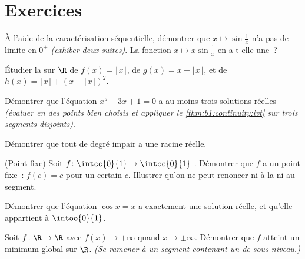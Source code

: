 \section{Exercices}

\begin{exercise}[$\star$]\label{exo:b1:continuity:1}
À l'aide de la caractérisation séquentielle, démontrer que $x \mapsto
\sin\frac 1x$ n'a pas de limite en $0^+$ \emph{(exhiber deux
suites)}. La fonction $x \mapsto x \sin\frac 1x$ en a-t-elle une~?
\end{exercise}

\begin{exercise}[$\star$]\label{exo:b1:continuity:2}
Étudier la  sur $\R$ de $f(x) = \lfloor x \rfloor$, de
$g(x) = x - \lfloor x \rfloor$, et de $h(x) = \lfloor x \rfloor +
(x - \lfloor x\rfloor)^2$.
\end{exercise}

\begin{exercise}[$\star$]\label{exo:b1:continuity:3}
Démontrer que l'équation $x^5 - 3x + 1 = 0$ a au moins trois
solutions réelles \emph{(évaluer en des points bien choisis et
appliquer le \cref{thm:b1:continuity:ivt} sur trois segments
disjoints)}.
\end{exercise}

\begin{exercise}[$\star$]\label{exo:b1:continuity:4}
Démontrer que tout  de degré impair a une racine réelle.
\end{exercise}

\begin{exercise}[$\star\star$]\label{exo:b1:continuity:5}
(Point fixe) Soit $f \colon \intcc{0}{1} \to \intcc{0}{1}$ .
Démontrer que $f$ a un point fixe~: $f(c) = c$ pour un certain $c$.
Illustrer qu'on ne peut renoncer ni à la  ni au segment.
\end{exercise}

\begin{exercise}[$\star\star$]\label{exo:b1:continuity:6}
Démontrer que l'équation $\cos x = x$ a exactement une solution
réelle, et qu'elle appartient à $\intoo{0}{1}$.
\end{exercise}

\begin{exercise}[$\star\star$]\label{exo:b1:continuity:7}
Soit $f \colon \R \to \R$  avec $f(x) \to +\infty$ quand $x
\to \pm\infty$. Démontrer que $f$ atteint un minimum global sur $\R$.
\emph{(Se ramener à un segment contenant un  de sous-niveau.)}
\end{exercise}

